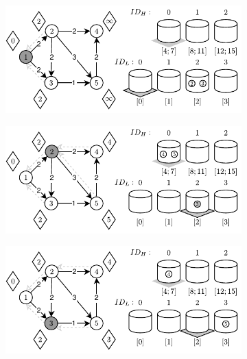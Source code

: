 \begin{figure}[!htbp]
	\ContinuedFloat
	\centering
	\begin{subfigure}[b]{0.45\textwidth}
		\includegraphics[width=\textwidth]{Chapter_II/DOUBLE-LEVEL-BUCKET-Example/b.pdf}
		\caption{}
	\end{subfigure}%
	\qquad
	\begin{subfigure}[b]{0.45\textwidth}
		\includegraphics[width=\textwidth]{Chapter_II/DOUBLE-LEVEL-BUCKET-Example/c.pdf}
		\caption{}
	\end{subfigure}
	\begin{subfigure}[b]{0.45\textwidth}
		\includegraphics[width=\textwidth]{Chapter_II/DOUBLE-LEVEL-BUCKET-Example/d.pdf}
		\caption{}
	\end{subfigure}%
	\qquad
	\begin{subfigure}[b]{0.45\textwidth}

\end{subfigure}
\end{figure}
